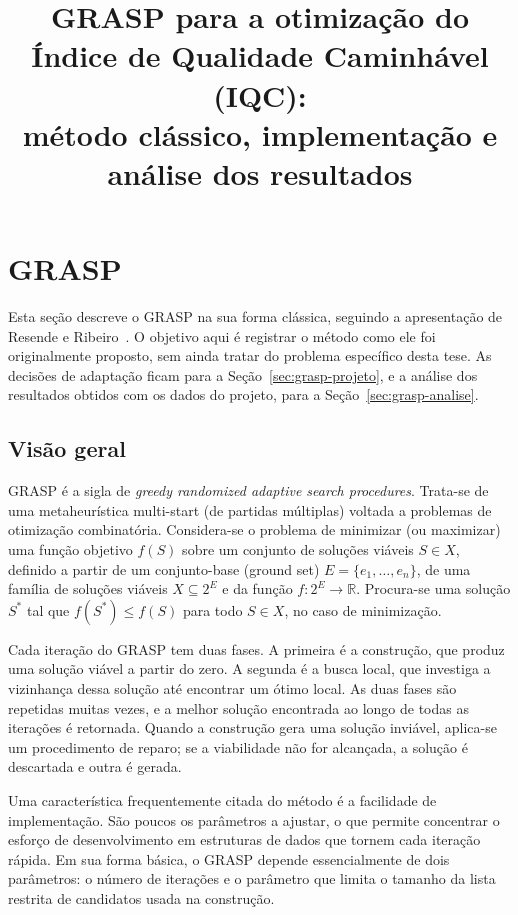 \documentclass[11pt,a4paper]{article}
\title{GRASP para a otimização do Índice de Qualidade Caminhável (IQC):\\ método clássico, implementação e análise dos resultados}
\author{}
\date{}
\begin{document}
\maketitle

\section{GRASP}
\label{sec:grasp-teoria}

Esta seção descreve o GRASP na sua forma clássica, seguindo a apresentação de Resende e Ribeiro~\cite{resendeRibeiro2008}. O objetivo aqui é registrar o método como ele foi originalmente proposto, sem ainda tratar do problema específico desta tese. As decisões de adaptação ficam para a Seção~\ref{sec:grasp-projeto}, e a análise dos resultados obtidos com os dados do projeto, para a Seção~\ref{sec:grasp-analise}.

\subsection{Visão geral}

GRASP é a sigla de \emph{greedy randomized adaptive search procedures}. Trata-se de uma metaheurística multi-start (de partidas múltiplas) voltada a problemas de otimização combinatória. Considera-se o problema de minimizar (ou maximizar) uma função objetivo $f(S)$ sobre um conjunto de soluções viáveis $S \in X$, definido a partir de um conjunto-base (ground set) $E = \{e_1,\dots,e_n\}$, de uma família de soluções viáveis $X \subseteq 2^E$ e da função $f: 2^E \rightarrow \mathbb{R}$. Procura-se uma solução $S^\ast$ tal que $f(S^\ast) \le f(S)$ para todo $S \in X$, no caso de minimização.

Cada iteração do GRASP tem duas fases. A primeira é a construção, que produz uma solução viável a partir do zero. A segunda é a busca local, que investiga a vizinhança dessa solução até encontrar um ótimo local. As duas fases são repetidas muitas vezes, e a melhor solução encontrada ao longo de todas as iterações é retornada. Quando a construção gera uma solução inviável, aplica-se um procedimento de reparo; se a viabilidade não for alcançada, a solução é descartada e outra é gerada.

Uma característica frequentemente citada do método é a facilidade de implementação. São poucos os parâmetros a ajustar, o que permite concentrar o esforço de desenvolvimento em estruturas de dados que tornem cada iteração rápida. Em sua forma básica, o GRASP depende essencialmente de dois parâmetros: o número de iterações e o parâmetro que limita o tamanho da lista restrita de candidatos usada na construção.
\end{document}
